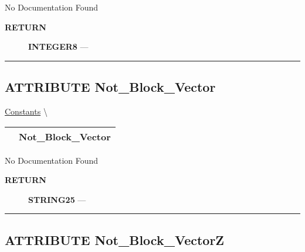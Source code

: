 \par





No Documentation Found








\par
\begin{description}
\item [\colorbox{tagtype}{\color{white} \textbf{\textsf{RETURN}}}] \textbf{INTEGER8} --- 
\end{description}




\rule{\linewidth}{0.5pt}
\subsection*{\textsf{\colorbox{headtoc}{\color{white} ATTRIBUTE}
Not\_Block\_Vector}}

\hypertarget{ecldoc:pbblas.constants.not_block_vector}{}
\hspace{0pt} \hyperlink{ecldoc:PBblas.Constants}{Constants} \textbackslash 

{\renewcommand{\arraystretch}{1.5}
\begin{tabularx}{\textwidth}{|>{\raggedright\arraybackslash}l|X|}
\hline
\hspace{0pt}\mytexttt{\color{red} } & \textbf{Not\_Block\_Vector} \\
\hline
\end{tabularx}
}

\par





No Documentation Found








\par
\begin{description}
\item [\colorbox{tagtype}{\color{white} \textbf{\textsf{RETURN}}}] \textbf{STRING25} --- 
\end{description}




\rule{\linewidth}{0.5pt}
\subsection*{\textsf{\colorbox{headtoc}{\color{white} ATTRIBUTE}
Not\_Block\_VectorZ}}

